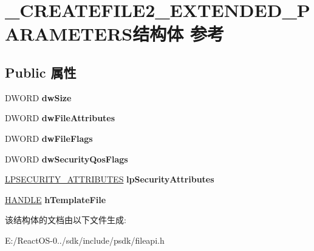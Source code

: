 \hypertarget{struct___c_r_e_a_t_e_f_i_l_e2___e_x_t_e_n_d_e_d___p_a_r_a_m_e_t_e_r_s}{}\section{\+\_\+\+C\+R\+E\+A\+T\+E\+F\+I\+L\+E2\+\_\+\+E\+X\+T\+E\+N\+D\+E\+D\+\_\+\+P\+A\+R\+A\+M\+E\+T\+E\+R\+S结构体 参考}
\label{struct___c_r_e_a_t_e_f_i_l_e2___e_x_t_e_n_d_e_d___p_a_r_a_m_e_t_e_r_s}
\subsection*{Public 属性}
\begin{DoxyCompactItemize}
\item 
\mbox{\label{struct___c_r_e_a_t_e_f_i_l_e2___e_x_t_e_n_d_e_d___p_a_r_a_m_e_t_e_r_s_aa3b77e32e8451891a5071d2577e7cdee}} 
D\+W\+O\+RD {\bfseries dw\+Size}
\item 
\mbox{\label{struct___c_r_e_a_t_e_f_i_l_e2___e_x_t_e_n_d_e_d___p_a_r_a_m_e_t_e_r_s_a68a9bd448ca18ec409ef9e9d7324f6ce}} 
D\+W\+O\+RD {\bfseries dw\+File\+Attributes}
\item 
\mbox{\label{struct___c_r_e_a_t_e_f_i_l_e2___e_x_t_e_n_d_e_d___p_a_r_a_m_e_t_e_r_s_a1efd287536b1ae931ac3db777da62101}} 
D\+W\+O\+RD {\bfseries dw\+File\+Flags}
\item 
\mbox{\label{struct___c_r_e_a_t_e_f_i_l_e2___e_x_t_e_n_d_e_d___p_a_r_a_m_e_t_e_r_s_aadb2b831d156284aa527da700f4a8c53}} 
D\+W\+O\+RD {\bfseries dw\+Security\+Qos\+Flags}
\item 
\mbox{\label{struct___c_r_e_a_t_e_f_i_l_e2___e_x_t_e_n_d_e_d___p_a_r_a_m_e_t_e_r_s_a072f1e8ab96580b2d0c0dd211b35dc9e}} 
\hyperlink{struct___s_e_c_u_r_i_t_y___a_t_t_r_i_b_u_t_e_s}{L\+P\+S\+E\+C\+U\+R\+I\+T\+Y\+\_\+\+A\+T\+T\+R\+I\+B\+U\+T\+ES} {\bfseries lp\+Security\+Attributes}
\item 
\mbox{\label{struct___c_r_e_a_t_e_f_i_l_e2___e_x_t_e_n_d_e_d___p_a_r_a_m_e_t_e_r_s_acebe8bee17e69e84de6daec07f297ed4}} 
\hyperlink{interfacevoid}{H\+A\+N\+D\+LE} {\bfseries h\+Template\+File}
\end{DoxyCompactItemize}


该结构体的文档由以下文件生成\+:\begin{DoxyCompactItemize}
\item 
E\+:/\+React\+O\+S-\/0../sdk/include/psdk/fileapi.\+h\end{DoxyCompactItemize}
